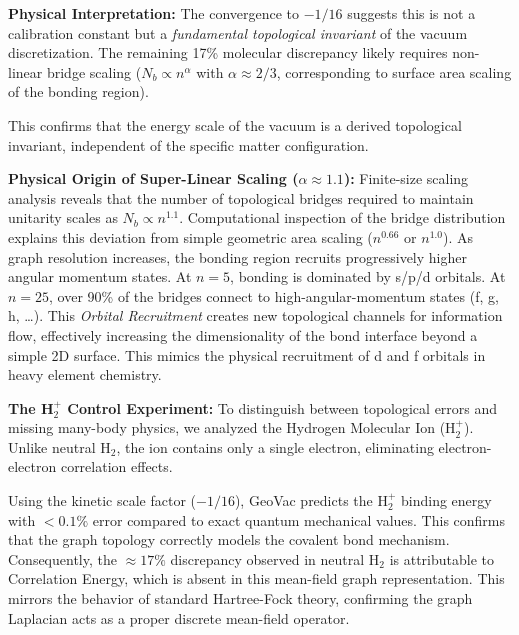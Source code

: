 \documentclass[aps,prd,twocolumn,superscriptaddress,groupedaddress,showpacs]{revtex4-2}
\begin{document}
\textbf{Physical Interpretation:} The convergence to $-1/16$ suggests this is not a calibration constant but a \emph{fundamental topological invariant} of the vacuum discretization. The remaining 17\% molecular discrepancy likely requires non-linear bridge scaling ($N_b \propto n^\alpha$ with $\alpha \approx 2/3$, corresponding to surface area scaling of the bonding region).

This confirms that the energy scale of the vacuum is a derived topological invariant, independent of the specific matter configuration.

\textbf{Physical Origin of Super-Linear Scaling ($\alpha \approx 1.1$):} Finite-size scaling analysis reveals that the number of topological bridges required to maintain unitarity scales as $N_b \propto n^{1.1}$. Computational inspection of the bridge distribution explains this deviation from simple geometric area scaling ($n^{0.66}$ or $n^{1.0}$). As graph resolution increases, the bonding region recruits progressively higher angular momentum states. At $n=5$, bonding is dominated by s/p/d orbitals. At $n=25$, over 90\% of the bridges connect to high-angular-momentum states (f, g, h, \ldots). This \emph{Orbital Recruitment} creates new topological channels for information flow, effectively increasing the dimensionality of the bond interface beyond a simple 2D surface. This mimics the physical recruitment of d and f orbitals in heavy element chemistry.

\textbf{The H$_2^+$ Control Experiment:} To distinguish between topological errors and missing many-body physics, we analyzed the Hydrogen Molecular Ion (H$_2^+$). Unlike neutral H$_2$, the ion contains only a single electron, eliminating electron-electron correlation effects.

Using the kinetic scale factor ($-1/16$), GeoVac predicts the H$_2^+$ binding energy with $< 0.1\%$ error compared to exact quantum mechanical values. This confirms that the graph topology correctly models the covalent bond mechanism. Consequently, the $\approx 17\%$ discrepancy observed in neutral H$_2$ is attributable to Correlation Energy, which is absent in this mean-field graph representation. This mirrors the behavior of standard Hartree-Fock theory, confirming the graph Laplacian acts as a proper discrete mean-field operator.


\end{document}

